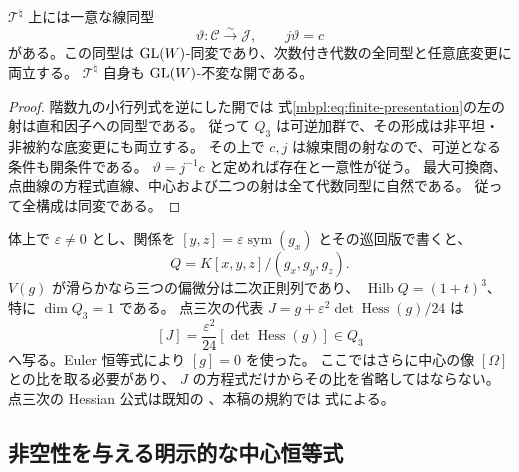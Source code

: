 \begin{proposition}[中心三次と点三次の自然な比較]
\label{mbpl:prop:line-comparison}
$\mathcal T^\natural$ 上には一意な線同型
\begin{equation}\label{mbpl:eq:canonical-comparison}
 \vartheta:\mathcal C\xrightarrow{\sim}\mathcal J,
 \qquad j\vartheta=c
\end{equation}
がある。この同型は $\operatorname{GL}(W)$-同変であり、次数付き代数の全同型と任意底変更に両立する。
$\mathcal T^\natural$ 自身も $\operatorname{GL}(W)$-不変な開である。
\end{proposition}
\begin{proof}
階数九の小行列式を逆にした開では
式\eqref{mbpl:eq:finite-presentation}の左の射は直和因子への同型である。
従って $Q_3$ は可逆加群で、その形成は非平坦・非被約な底変更にも両立する。
その上で $c,j$ は線束間の射なので、可逆となる条件も開条件である。
$\vartheta=j^{-1}c$ と定めれば存在と一意性が従う。
最大可換商、点曲線の方程式直線、中心および二つの射は全て代数同型に自然である。
従って全構成は同変である。
\end{proof}

\begin{remark}
\label{mbpl:rem:jacobian-chart}
体上で $\varepsilon\ne0$ とし、関係を
$[y,z]=\varepsilon\operatorname{sym}(g_x)$ とその巡回版で書くと、
\[
 Q=K[x,y,z]/(g_x,g_y,g_z).
\]
$V(g)$ が滑らかなら三つの偏微分は二次正則列であり、
$\operatorname{Hilb}Q=(1+t)^3$、特に $\dim Q_3=1$ である。
点三次の代表 $J=g+\varepsilon^2\det\operatorname{Hess}(g)/24$ は
\[
 [J]=\frac{\varepsilon^2}{24}[\det\operatorname{Hess}(g)]\in Q_3
\]
へ写る。Euler 恒等式により $[g]=0$ を使った。
ここではさらに中心の像 $[\Omega]$ との比を取る必要があり、
$J$ の方程式だけからその比を省略してはならない。
点三次の Hessian 公式は既知の
\cite[Theorem~7.2]{MoriSmith}、本稿の規約では
式による。
\end{remark}

\subsection{非空性を与える明示的な中心恒等式}

